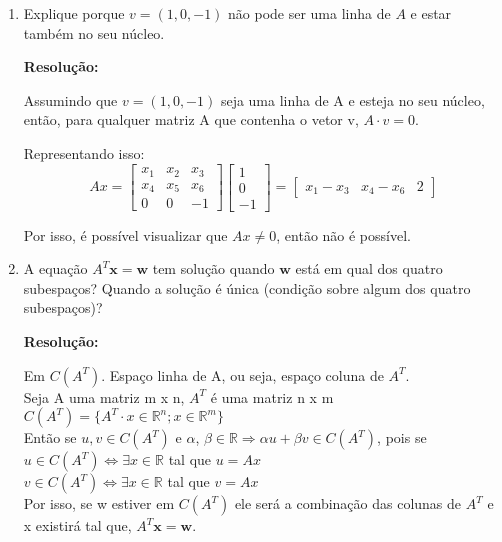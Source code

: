 \documentclass[leqno]{article}
\numberwithin{equation}{section}
\theoremstyle{definition}
\newcommand{\bR}{\mathbb{R}}
\newcommand{\bfw}{\mathbf{w}}
\newcommand{\bfx}{\mathbf{x}}
\newenvironment{sol}
	{
		\vspace{4mm}
		\noindent\textbf{Resolução:}
		\strut\newline
		\smallskip
		\hspace{-3.5mm}
	}
	{}
\begin{document}
\begin{enumerate}
\begin{sol}
		-------------------------------------------------------------------------------------------------------------------------------------\\
		
		\end{sol} 
		
		\item Explique porque $v = (1, 0, -1)$ não pode ser uma linha de $A$ e estar também no seu núcleo.
		
		\begin{sol} 
			Assumindo que $v = (1, 0, -1)$ seja uma linha de A e esteja no seu núcleo, então, para qualquer matriz A que contenha o vetor v, $A \cdot v = 0$.
			
			Representando isso: 
			$$Ax = \begin{bmatrix}
				x_1 & x_2 & x_3 \\
				x_4 & x_5 & x_6 \\
				0 & 0 & -1
			\end{bmatrix}
			\begin{bmatrix}
				1 \\
				0 \\
				-1
			\end{bmatrix}=
			\begin{bmatrix}
				x_1 - x_3 & x_4 - x_6 & 2
			\end{bmatrix}$$
		
		Por isso, é possível visualizar que $Ax \neq 0$, então não é possível.
		\end{sol} 
		
		\item A equação $A^T \bfx = \bfw$ tem solução quando $\bfw$ está em qual dos quatro subespaços? Quando a solução é única (condição sobre algum dos quatro subespaços)?
		
		\begin{sol} 
			Em $C(A^T)$. Espaço linha de A, ou seja, espaço coluna de $A^T$.\\
			\vspace{0.1cm}
			Seja A uma matriz m x n, $A^T$ é uma matriz n x m\\
			\vspace{0.1cm}
			$C(A^T) = \{A^T \cdot x \in \bR^n; x \in \bR^m\}$\\
			\vspace{0.1cm}
			Então se $u, v \in C(A^T)$ e $\alpha$, $\beta \in \bR \Rightarrow \alpha u + \beta v \in C(A^T)$, pois se\\
			\vspace{0.1cm}
			$u \in C(A^T) \Longleftrightarrow \exists x \in \bR$ tal que $u = Ax$\\
			\vspace{0.1cm}
			$v \in C(A^T) \Longleftrightarrow \exists x \in \bR$ tal que $v = Ax$\\
			\vspace{0.1cm}
			Por isso, se w estiver em $C(A^T)$ ele será a combinação das colunas de $A^T$ e x existirá tal que, $A^T \bfx = \bfw$.
		\end{sol} 
		

\end{enumerate}
\end{document}
